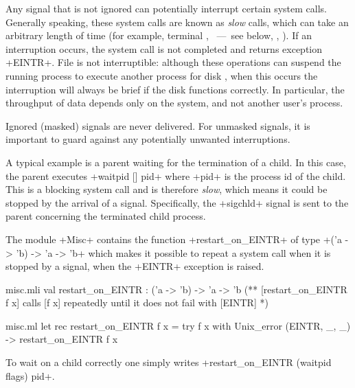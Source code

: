 Any signal that is not ignored can potentially interrupt 
certain system calls.  Generally speaking, these system calls are 
known as \emph{slow} calls, which can take an arbitrary length of time (for
example, terminal \io, ~---~see below, , \etc).
If an interruption occurs, the system call is not completed and
returns exception \ml+EINTR+.  File \io{} is not interruptible:
although these operations can suspend the running process to 
execute another process for disk \io{}, when this occurs the interruption
will always be brief if the disk functions correctly.  In particular, 
the throughput of data depends only on the system, and not another user's
process.

Ignored (masked) signals are never delivered.  For unmasked 
signals, it is important to guard against any potentially 
unwanted interruptions.

A typical example is a parent waiting for the termination of a child.
In this case, the parent executes \ml+waitpid [] pid+ where \ml+pid+ 
is the process id of the child.  This is a blocking system call and 
is therefore \emph{slow}, which means it could be stopped by the 
arrival of a signal.  Specifically, the \ml+sigchld+ signal is sent 
to the parent concerning the terminated child process.

The module \ml+Misc+ contains the function
\ml+restart_on_EINTR+ of type \ml+('a -> 'b) -> 'a -> 'b+ which
makes it possible to repeat a system call when it is stopped
by a signal, \ie{} when the \ml+EINTR+ exception is raised.

%
\begin{codefile}{misc.mli}
val restart_on_EINTR : ('a -> 'b) -> 'a -> 'b
(** [restart_on_EINTR f x] calls [f x] repeatedly until it does not fail
with [EINTR] *)
\end{codefile}
%
\begin{listingcodefile}{misc.ml}
let rec restart_on_EINTR f x = 
  try f x with Unix_error (EINTR, _, _) -> restart_on_EINTR f x
\end{listingcodefile}
\label{restart_on_EINTR}%
To wait on a child correctly one simply writes
\ml+restart_on_EINTR (waitpid flags) pid+.

